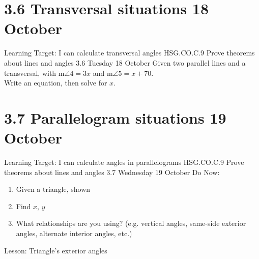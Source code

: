 \section{3.6 Transversal situations \hfill 18 October}
\begin{frame}{Learning Target: I can calculate transversal angles}
  {HSG.CO.C.9 Prove theorems about lines and angles  \hfill \alert{3.6 Tuesday 18 October}}
  Given two parallel lines and a transversal, with m$\angle 4 = 3x$ and m$\angle 5 = x + 70$. \\ Write an equation, then solve for $x$.
  \begin{flushright}
  \end{flushright}
\end{frame}

\section{3.7 Parallelogram situations \hfill 19 October}
\begin{frame}{Learning Target: I can calculate angles in parallelograms}
  {HSG.CO.C.9 Prove theorems about lines and angles  \hfill \alert{3.7 Wednesday 19 October}}
  Do Now: 
  \begin{multicols}{2}
    \begin{enumerate}
      \item Given a triangle, shown
      \item Find $x$, $y$
      \item What relationships are you using? (e.g. vertical angles, same-side exterior angles, alternate interior angles, etc.)
    \end{enumerate}
  \end{multicols}
  Lesson: Triangle's exterior angles
\end{frame}

